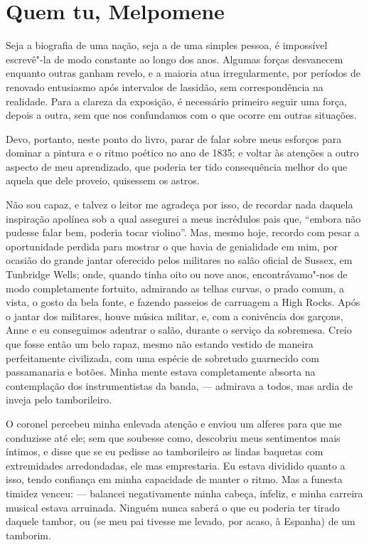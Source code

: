 \chapter{Quem tu, Melpomene} %

Seja a biografia de uma nação, seja a de uma simples pessoa, é
impossível escrevê"-la de modo constante ao longo dos anos. Algumas
forças desvanecem enquanto outras ganham revelo, e a maioria atua
irregularmente, por períodos de renovado entusiasmo após intervalos de
lassidão, sem correspondência na realidade. Para a clareza da exposição,
é necessário primeiro seguir uma força, depois a outra, sem que nos
confundamos com o que ocorre em outras situações.

Devo, portanto, neste ponto do livro, parar de falar sobre meus esforços
para dominar a pintura e o ritmo poético no ano de 1835; e voltar às
atenções a outro aspecto de meu aprendizado, que poderia ter tido
consequência melhor do que aquela que dele proveio, quisessem os astros.

Não sou capaz, e talvez o leitor me agradeça por isso, de recordar
nada daquela inspiração apolínea sob a qual assegurei a meus incrédulos
pais que, ``embora não pudesse falar bem, poderia tocar violino''. Mas,
mesmo hoje, recordo com pesar a oportunidade perdida para mostrar o que
havia de genialidade em mim, por ocasião do grande jantar oferecido
pelos militares no salão oficial de Sussex, em Tunbridge Wells; onde,
quando tinha oito ou nove anos, encontrávamo"-nos de modo completamente
fortuito, admirando as telhas curvas, o prado comum, a vista, o gosto da
bela fonte, e fazendo passeios de carruagem a High Rocks. Após o jantar
dos militares, houve música militar, e, com a conivência dos garçons,
Anne e eu conseguimos adentrar o salão, durante o serviço da sobremesa.
Creio que fosse então um belo rapaz, mesmo não estando vestido de
maneira perfeitamente civilizada, com uma espécie de sobretudo
guarnecido com passamanaria e botões. Minha mente estava completamente
absorta na contemplação dos instrumentistas da banda, --- admirava a
todos, mas ardia de inveja pelo tamborileiro.

O coronel percebeu minha enlevada atenção e enviou um alferes para que
me conduzisse até ele; sem que soubesse como, descobriu meus sentimentos
mais íntimos, e disse que se eu pedisse ao tamborileiro as lindas
baquetas com extremidades arredondadas, ele mas emprestaria. Eu estava
dividido quanto a isso, tendo confiança em minha capacidade de manter o
ritmo. Mas a funesta timidez venceu: --- balancei negativamente minha
cabeça, infeliz, e minha carreira musical estava arruinada. Ninguém
nunca saberá o que eu poderia ter tirado daquele tambor, ou (se meu pai
tivesse me levado, por acaso, à Espanha) de um tamborim.

